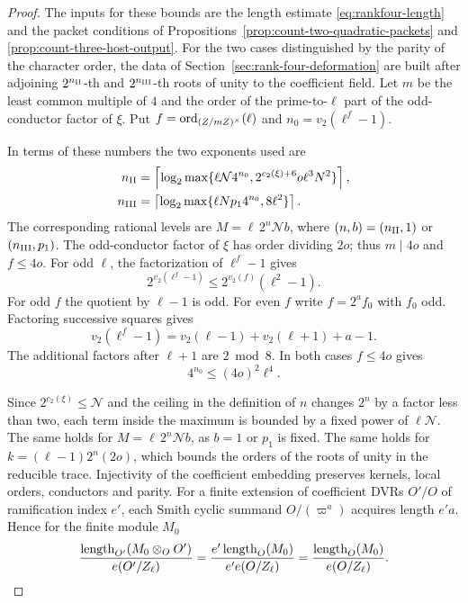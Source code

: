 \begin{proof}

The inputs for these bounds are the length estimate
\eqref{eq:rankfour-length} and the packet conditions of
Propositions~\ref{prop:count-two-quadratic-packets}
and \ref{prop:count-three-host-output}.
For the two cases distinguished by the parity of the character order,
the data of Section~\ref{sec:rank-four-deformation}
are built after adjoining \(2^{n_{\rm II}}\)-th and
\(2^{n_{\rm III}}\)-th roots of unity to the coefficient field.
Let \(m\) be the least common multiple of \(4\) and the order
of the prime-to-\(\ell\) part of the odd-conductor factor of
\(\xi\). Put \(f=\operatorname{ord}_{(Z/mZ)^\times}(\ell)\)
and \(n_0=v_2(\ell^f-1)\).

In terms of these numbers the two
exponents used are
\begin{equation}\label{eq:ordinary-dyadic-exponents}
\begin{split}
 n_{\rm II}&=\left\lceil\log_2\max\{\ell\mathcal N4^{n_0},
             2^{c_2(\xi)+6}o\ell^3N^2\}\right\rceil,\\
 n_{\rm III}&=\left\lceil\log_2\max\{\ell Np_14^{n_0},
             8\ell^2\}\right\rceil .
\end{split}
\end{equation}
The corresponding rational levels are \(M=\ell\,2^n\mathcal N b\),
where \((n,b)=(n_{\rm II},1)\) or \((n_{\rm III},p_1)\).
The odd-conductor factor of \(\xi\) has order dividing \(2o\);
thus \(m\mid4o\) and \(f\le4o\). For odd \(\ell\), the
factorization of \(\ell^f-1\) gives
\[
 2^{v_2(\ell^f-1)}\le 2^{v_2(f)}(\ell^2-1).
\]
For odd \(f\) the quotient by \(\ell-1\) is odd.
For even \(f\) write \(f=2^af_0\) with \(f_0\) odd. Factoring
successive squares gives
\[
 v_2(\ell^f-1)=v_2(\ell-1)+v_2(\ell+1)+a-1.
\]
The additional factors after \(\ell+1\) are \(2\bmod8\).
In both cases \(f\le4o\) gives
\[
 4^{n_0}\le(4o)^2\ell^4.
\]

Since
\(2^{c_2(\xi)}\le\mathcal N\) and the ceiling in the
definition of \(n\) changes \(2^n\) by a factor less than two,
each term inside the maximum is bounded by a fixed
power of \(\ell\mathcal N\). The same holds for
\(M=\ell\,2^n\mathcal N b\), as \(b=1\) or \(p_1\) is fixed. The same
holds for \(k=(\ell-1)2^n(2o)\), which bounds the orders of the
roots of unity in the reducible trace. Injectivity of the
coefficient embedding preserves kernels, local orders,
conductors and parity. For a finite extension of coefficient DVRs \(O'/O\) of ramification index \(e'\), each Smith cyclic summand \(O/(\varpi^a)\) acquires length \(e'a\). Hence for the finite module \(M_0\)
\[
 \frac{\operatorname{length}_{O'}(M_0\otimes_O O')}{e(O'/Z_\ell)}
 =\frac{e'\operatorname{length}_O(M_0)}{e' e(O/Z_\ell)}
 =\frac{\operatorname{length}_O(M_0)}{e(O/Z_\ell)} .
\]


\end{proof}
